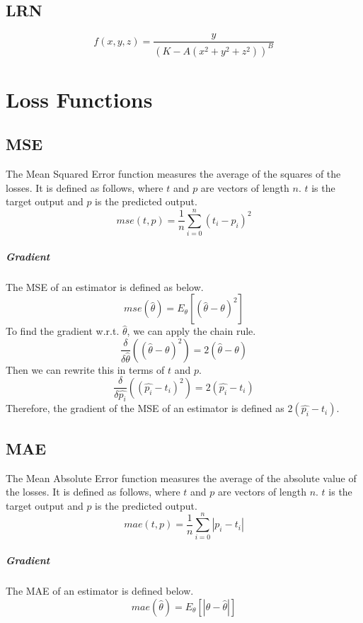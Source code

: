 \documentclass{report}
\begin{document}
        \section{LRN}
            $$f(x, y, z) = \frac{y}{(K - A(x^2 + y^2 + z^2))^B}$$

    \chapter{Loss Functions}

        \section{MSE}
            The Mean Squared Error function measures the average of the squares of the losses.  It is defined as follows, where $t$ and $p$ are 
            vectors of length $n$. $t$ is the target output and $p$ is the predicted output. 
            $$mse(t, p) = \frac{1}{n} \sum_{i=0}^{n} (t_i - p_i)^2$$ 
            
            \paragraph{Gradient}
                The MSE of an estimator is defined as below\cite{wiki:Mean_squared_error}.
                $$mse(\hat{\theta}) = E_\theta [(\hat{\theta} - \theta)^2]$$
                To find the gradient w.r.t. $\hat{\theta}$, we can apply the chain rule. 
                $$\frac{\delta}{\delta{\hat{\theta}}}((\hat{\theta} - \theta)^2) = 2(\hat{\theta} - \theta)$$
                Then we can rewrite this in terms of $t$ and $p$. 
                $$\frac{\delta}{\delta{\hat{p_i}}}((\hat{p_i} - t_i)^2) = 2(\hat{p_i} - t_i)$$
                Therefore, the gradient of the MSE of an estimator is defined as $2(\hat{p_i} - t_i)$.

        \section{MAE}
            The Mean Absolute Error function measures the average of the absolute value of the losses. It is defined as follows, where $t$ and $p$
            are vectors of length $n$. $t$ is the target output and $p$ is the predicted output. 
            $$mae(t, p) = \frac{1}{n} \sum_{i=0}^{n} |p_i - t_i|$$

            \paragraph{Gradient}
                The MAE of an estimator is defined below.
                $$mae(\hat{\theta}) = E_\theta[|\theta - \hat{\theta}|]$$

    \printbibliography
\end{document}

